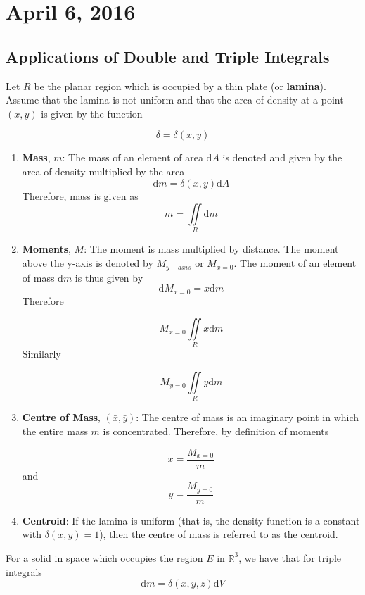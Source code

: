 \documentclass[11pt]{article}
\theoremstyle{plain} %
\theoremstyle{definition}
\theoremstyle{example}
\theoremstyle{remark}
\begin{document}
\section{April 6, 2016}
\subsection{Applications of Double and Triple Integrals}

Let $R$ be the planar region which is occupied by a thin plate (or \textbf{lamina}). Assume that the lamina is not uniform and that the area of density at a point $(x,y)$ is given by the function 

$$\delta = \delta(x,y)$$

\begin{enumerate}
	\item \textbf{Mass}, $m$: The mass of an element of area $\mathrm d A$ is denoted and given by the area of density multiplied by the area$$\mathrm d m = \delta(x,y) \mathrm d A$$ Therefore, mass is given as
	$$m = \iint \limits_R \mathrm d m$$
	\item \textbf{Moments}, $M$: The moment  is mass multiplied by distance. The moment above the y-axis is denoted by $M_{y-axis}$ or $M_{x=0}$. The moment of an element of mass $\mathrm d m$ is thus given by $$\mathrm d M_{x=0} = x \mathrm d m$$ Therefore
	
	$$M_{x=0} \iint \limits_R x \mathrm d m$$
	Similarly
	
	$$M_{y=0} \iint \limits_R y \mathrm d m$$
	\item \textbf{Centre of Mass}, $(\bar{x},\bar{y})$: The centre of mass is an imaginary point in which the entire mass $m$ is concentrated. Therefore, by definition of moments
	
	$$\bar{x} = \frac{M_{x=0}}{m}$$
	and 
	$$\bar{y} = \frac{M_{y=0}}{m}$$
	\item \textbf{Centroid}: If the lamina is uniform (that is, the density function is a constant with $\delta(x,y)=1$), then the centre of mass is referred to as the centroid. 
\end{enumerate}

For a solid in space which occupies the region $E$ in $\mathbb R^3$, we have that for triple integrals $$\mathrm d m = \delta(x, y, z) \mathrm d V$$
\end{document}

